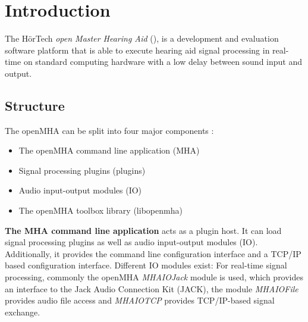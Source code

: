 
\section{Introduction}
The H\"{o}rTech \emph{open Master Hearing Aid} (\mha), is a development
and evaluation software platform that is able to execute hearing aid signal
processing in real-\/time on standard computing hardware with a low delay
between sound input and output.

\subsection{Structure}\label{index_str}
The openMHA can be split into four major components :
\begin{itemize}
\item The openMHA command line application (MHA)
\item Signal processing plugins (plugins)
\item Audio input-\/output modules (IO)
\item The openMHA toolbox library (libopenmha)
\end{itemize} 

{\bf The MHA command line application} acts as a plugin host. It can
load signal processing plugins as well as audio input-\/output modules
(IO). Additionally, it provides the command line configuration
interface and a TCP/IP based configuration interface. Different IO
modules exist: For real-\/time signal processing, commonly the openMHA
\emph{MHAIOJack} module is used, which provides an
interface to the Jack Audio Connection Kit (JACK), the module
\emph{MHAIOFile} provides audio file access and \emph{MHAIOTCP}
provides TCP/IP-\/based signal exchange.


